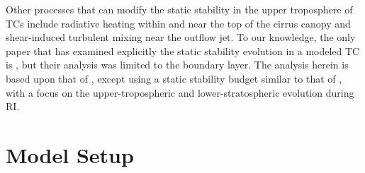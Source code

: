 \documentclass{ametsoc}
\begin{document}
Other processes that can modify the static stability in the upper troposphere of TCs include radiative heating within and near the top of the cirrus canopy and shear-induced turbulent mixing near the outflow jet.
To our knowledge, the only paper that has examined explicitly the static stability evolution in a modeled TC is \cite{Kepertetal2016}, but their analysis was limited to the boundary layer.
The analysis herein is based upon that of \cite{SternZhang2013}, except using a static stability budget similar to that of \cite{Kepertetal2016}, with a focus on the upper-tropospheric and lower-stratospheric evolution during RI.

 \section{Model Setup}
\end{document}
